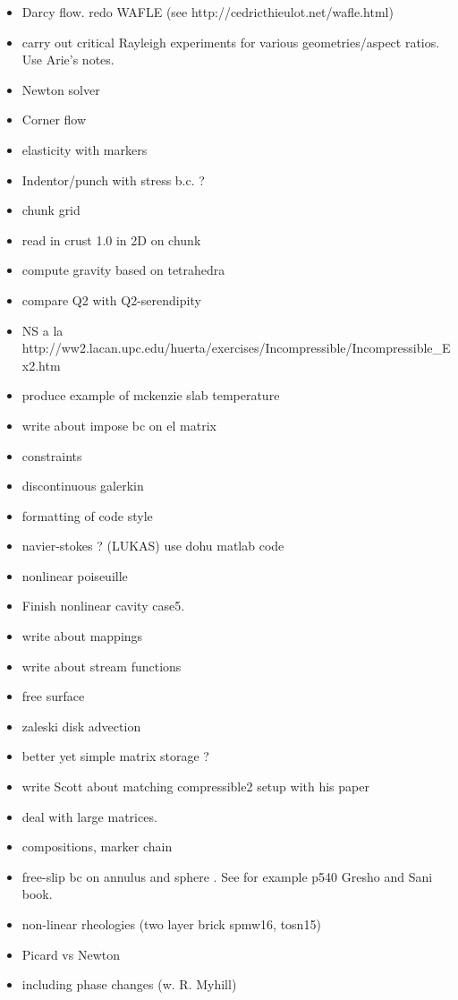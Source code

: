 
\begin{itemize}
\item Darcy flow. redo WAFLE (see http://cedricthieulot.net/wafle.html)
\item carry out critical Rayleigh experiments for various geometries/aspect ratios. Use Arie's notes. 
\item Newton solver
\item Corner flow 
\item elasticity with markers
\item Indentor/punch with stress b.c. ?
\item chunk grid
\item read in crust 1.0 in 2D on chunk
\item compute gravity based on tetrahedra
\item compare Q2 with Q2-serendipity
\item NS a la http://ww2.lacan.upc.edu/huerta/exercises/Incompressible/Incompressible\_Ex2.htm
\item produce example of mckenzie slab temperature
\item write about impose bc on el matrix
\item constraints
\item discontinuous galerkin
\item formatting of code style
\item navier-stokes ? (LUKAS) use dohu matlab code
\item nonlinear poiseuille
\item Finish nonlinear cavity case5.
\item write about mappings 
\item write about stream functions 
\item free surface 
\item zaleski disk advection
\item better yet simple matrix storage ?
\item write Scott about matching compressible2 setup with his paper
\item deal with large matrices. 
\item compositions, marker chain
\item free-slip bc on annulus and sphere . See for example p540 Gresho and Sani book.
\item non-linear rheologies (two layer brick spmw16, tosn15) 
\item Picard vs Newton
\item including phase changes (w. R. Myhill)

\end{itemize}
